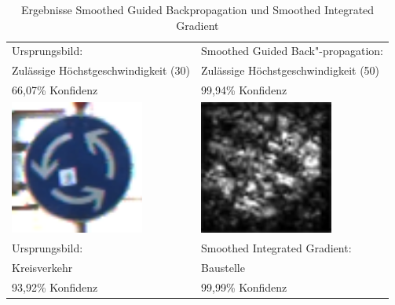 \begin{table}
\begin{tabular}{p{}p{7cm}}
		Ursprungsbild: & Smoothed Guided Back"-propagation:\\
		Zulässige Höchstgeschwindigkeit (30) & Zulässige Höchstgeschwindigkeit (50)\\
		66,07\% Konfidenz & 99,94\% Konfidenz\\
		\includegraphics[height=4.4cm]{Images/AnPe/5_2_Unten_links} &\includegraphics[height=4.4cm]{Images/AnPe/5_2_Unten_rechts}  \\
		Ursprungsbild: & Smoothed Integrated Gradient:\\
		Kreisverkehr & Baustelle\\
		93,92\% Konfidenz & 99,99\% Konfidenz\\
	\end{tabular}
	\caption{Ergebnisse Smoothed Guided Backpropagation und Smoothed Integrated Gradient}
\label{tab:sal2}
\end{table}



